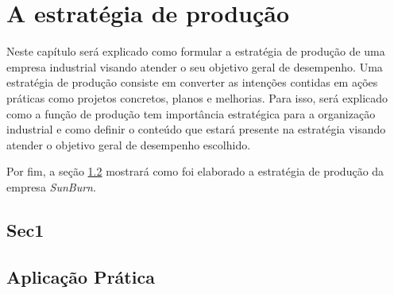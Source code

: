 \chapter{A estratégia de produção} 
\label{chap:estrategia_da_producao} 
Neste capítulo será explicado como formular a estratégia de produção de uma empresa industrial visando atender o seu objetivo geral de desempenho. Uma estratégia de produção consiste em converter as intenções contidas em ações práticas como projetos concretos, planos e melhorias. Para isso, será explicado como a função de produção tem importância estratégica para a organização industrial e como definir o conteúdo que estará presente na estratégia visando atender o objetivo geral de desempenho escolhido. 

Por fim, a seção \ref{sec:estrategia_da_producao_aplicacao} mostrará como foi elaborado a estratégia de produção da empresa \textit{SunBurn}. 

\section{Sec1} 
\label{sec:estrategia_da_producao_sec1} 


\section{Aplicação Prática} 
\label{sec:estrategia_da_producao_aplicacao}